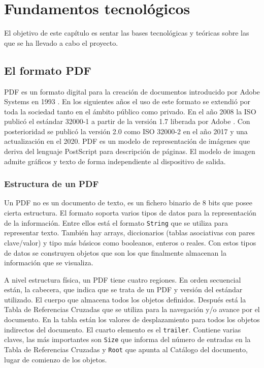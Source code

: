 
\chapter{Fundamentos tecnológicos}
\label{chap:fundamentos-tecnologicos}

El objetivo de este capítulo es sentar las bases tecnológicas y teóricas sobre las que se ha llevado a cabo el proyecto.

\section{El formato PDF}

PDF es un formato digital para la creación de documentos introducido por Adobe Systems en 1993 \cite{adobe_systems_inc_quick_2010}. En los siguientes años el uso de este formato se extendió por toda la sociedad tanto en el ámbito público como privado. En el año 2008 la ISO publicó el estándar 32000-1 a partir de la versión 1.7 liberada por Adobe \cite{adobe_systems_inc_iso_2008}. Con posterioridad se publicó la versión 2.0 como ISO 32000-2 \cite{international_organization_for_standardization_iso_2017} en el año 2017 y una actualización en el 2020. PDF es un modelo de representación de imágenes que deriva del lenguaje PostScript para descripción de páginas. El modelo de imagen admite gráficos y texto de forma independiente al dispositivo de salida. 

\subsection{Estructura de un PDF}

Un PDF no es un documento de texto, es un fichero binario de 8 bits que posee cierta estructura. El formato soporta varios tipos de datos para la representación de la información. Entre ellos está el formato \verb|String| que se utiliza para representar texto. También hay arrays, diccionarios (tablas asociativas con pares clave/valor) y tipo más básicos como booleanos, enteros o reales. Con estos tipos de datos se construyen objetos que son los que finalmente almacenan la información que se visualiza.

A nivel estructura física, un PDF tiene cuatro regiones. En orden secuencial están, la cabecera, que indica que se trata de un PDF y versión del estándar utilizado. El cuerpo que almacena todos los objetos definidos. Después está la Tabla de Referencias Cruzadas que se utiliza para la navegación y/o avance por el documento. En la tabla están los valores de desplazamiento para todos los objetos indirectos del documento. El cuarto elemento es el \verb|trailer|. Contiene varias claves, las más importantes son \verb|Size| que informa del número de entradas en la Tabla de Referencias Cruzadas y \verb|Root| que apunta al Catálogo del documento, lugar de comienzo de los objetos.

